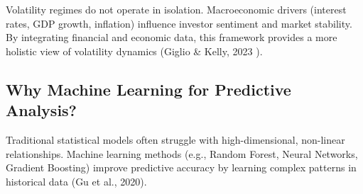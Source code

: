 Volatility regimes do not operate in isolation. Macroeconomic drivers (interest rates, GDP growth, inflation) influence investor sentiment and market stability. By integrating financial and economic data, this framework provides a more holistic view of volatility dynamics (Giglio \& Kelly, 2023 \cite{giglio_kelly_2023}).

\subsection{Why Machine Learning for Predictive Analysis?}

Traditional statistical models often struggle with high-dimensional, non-linear relationships. Machine learning methods (e.g., Random Forest, Neural Networks, Gradient Boosting) improve predictive accuracy by learning complex patterns in historical data (Gu et al., 2020).

